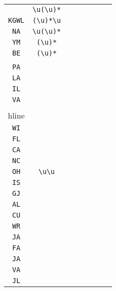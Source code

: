 \begin{longtable}{cccccccc}
\begin{tabular}{ll}
    \verb|KO| & \verb|\u(\u)*|\\
\verb|KGWL| & \verb|(\u)*\u|\\
\verb|NA| & \verb|\u(\u)*|\\
\verb|YM| & \verb|(\u)*|\\
\verb|BE| & \verb|(\u)*|
\end{tabular}
\\\midrule 
\begin{tabular}{l}
    \verb|GA|\\
\verb|PA|\\
\verb|LA|\\
\verb|IL|\\
\verb|VA|\\
\\hline\\
\verb|WI|\\
\verb|FL|\\
\verb|CA|\\
\verb|NC|\\
\verb|OH|
\end{tabular}

&
\verb|\u\u|
&

\begin{tabular}{l}
    \verb|\u\u|\\
\verb|IS|\\
\verb|GJ|\\
\verb|AL|\\
\verb|CU|\\
\verb|WR|
\end{tabular}

&

\begin{tabular}{l}
    \verb.\u(A)|(\u).\\
\verb|JA|\\
\verb|FA|\\
\verb|JA|\\
\verb|VA|\\
\verb|JL|
\end{tabular}

&


\end{longtable}
